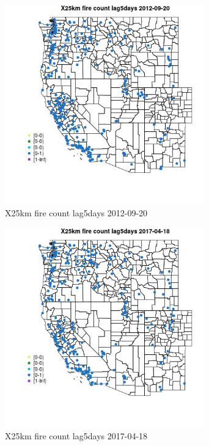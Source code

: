 \begin{figure} 
\centering  
\includegraphics[width=0.77\textwidth]{Code_Outputs/Report_ML_input_PM25_Step4_part_e_de_duplicated_aves_compiled_2019-05-14wNAs_MapObsX25km_fire_count_lag5days2012-09-20.jpg} 
\caption{\label{fig:Report_ML_input_PM25_Step4_part_e_de_duplicated_aves_compiled_2019-05-14wNAsMapObsX25km_fire_count_lag5days2012-09-20}X25km fire count lag5days 2012-09-20} 
\end{figure} 
 

\begin{figure} 
\centering  
\includegraphics[width=0.77\textwidth]{Code_Outputs/Report_ML_input_PM25_Step4_part_e_de_duplicated_aves_compiled_2019-05-14wNAs_MapObsX25km_fire_count_lag5days2017-04-18.jpg} 
\caption{\label{fig:Report_ML_input_PM25_Step4_part_e_de_duplicated_aves_compiled_2019-05-14wNAsMapObsX25km_fire_count_lag5days2017-04-18}X25km fire count lag5days 2017-04-18} 
\end{figure} 
 

